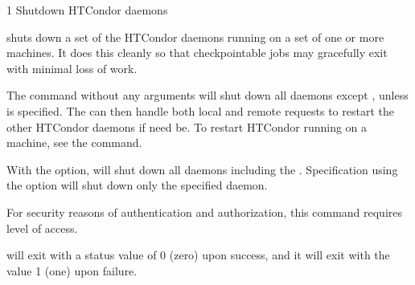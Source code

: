 \begin{ManPage}{\label{man-condor-off}}{1}
{Shutdown HTCondor daemons}

\Synopsis {}
\ToolArgsBase

\ToolDebugOption
\ToolWhere
\ToolArgsAffect

\Description 

 shuts down a set of the HTCondor daemons running on a set of
one or more machines.
It does this cleanly so that checkpointable jobs may gracefully exit with
minimal loss of work.

The command  without any arguments will shut down
all daemons except , unless  is
specified.
The  can then handle both local and remote
requests to restart the other HTCondor daemons if need be.  To restart
HTCondor running on a machine, see the  command.

With the  option,  will shut down
all daemons including the .
Specification using the  option
will shut down
only the specified daemon.

For security reasons of authentication and authorization,
this command requires  level of access.

\begin{Options}
	\ToolArgsBaseDesc
	\ToolDebugDesc
	\ToolArgsLocateDesc
	\ToolArgsAffectDesc
\end{Options}

\ExitStatus
{} will exit with a status value of 0 (zero) upon success,
and it will exit with the value 1 (one) upon failure.



\end{ManPage}
